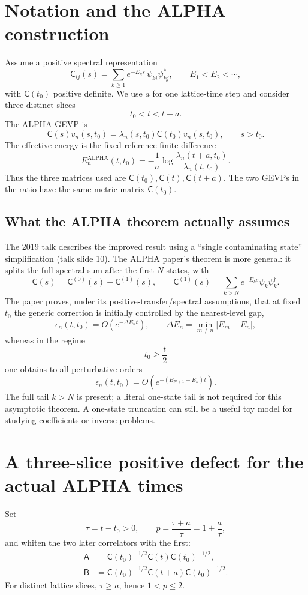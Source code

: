 \documentclass[11pt]{article}
\newcommand{\C}{\mathsf C}
\newcommand{\A}{\mathsf A}
\newcommand{\B}{\mathsf B}
\newcommand{\Ealp}{E^{\mathrm{ALPHA}}}
\begin{document}
\section{Notation and the ALPHA construction}
Assume a positive spectral representation
\[
\C_{ij}(s)=\sum_{k\geq1}e^{-E_k s}\,\psi_{ki}\psi_{kj}^*,\qquad
E_1<E_2<\cdots,
\]
with $\C(t_0)$ positive definite. We use $a$ for one lattice-time step and consider three distinct slices
\[
t_0<t<t+a.
\]
The ALPHA GEVP is
\[
\C(s)v_n(s,t_0)=\lambda_n(s,t_0)\C(t_0)v_n(s,t_0),
\qquad s>t_0.
\]
The effective energy is the fixed-reference finite difference
\begin{equation}
\Ealp_n(t,t_0)=-\frac1a\log\frac{\lambda_n(t+a,t_0)}{\lambda_n(t,t_0)}.
\label{eq:alpha}
\end{equation}
Thus the three matrices used are $\C(t_0),\C(t),\C(t+a)$. The two GEVPs in the ratio have the same metric matrix $\C(t_0)$.

\subsection*{What the ALPHA theorem actually assumes}
The 2019 talk describes the improved result using a ``single contaminating state'' simplification (talk slide 10). The ALPHA paper's theorem is more general: it splits the full spectral sum after the first $N$ states, with
\[
\C(s)=\C^{(0)}(s)+\C^{(1)}(s),\qquad
\C^{(1)}(s)=\sum_{k>N}e^{-E_k s}\psi_k\psi_k^\dagger.
\]
The paper proves, under its positive-transfer/spectral assumptions, that at fixed $t_0$ the generic correction is initially controlled by the nearest-level gap,
\[
\epsilon_n(t,t_0)=O(e^{-\Delta E_n t}),\qquad
\Delta E_n=\min_{m\ne n}|E_m-E_n|,
\]
whereas in the regime
\begin{equation}
 t_0\geq\frac t2
 \label{eq:alphacond}
\end{equation}
one obtains to all perturbative orders
\begin{equation}
\boxed{\epsilon_n(t,t_0)=O\!\left(e^{-(E_{N+1}-E_n)t}\right).}
\label{eq:alphagap}
\end{equation}
The full tail $k>N$ is present; a literal one-state tail is not required for this asymptotic theorem. A one-state truncation can still be a useful toy model for studying coefficients or inverse problems.

\section{A three-slice positive defect for the actual ALPHA times}
Set
\[
\tau=t-t_0>0,\qquad p=\frac{\tau+a}{\tau}=1+\frac a\tau,
\]
and whiten the two later correlators with the first:
\begin{align}
\A&=\C(t_0)^{-1/2}\C(t)\C(t_0)^{-1/2},\\
\B&=\C(t_0)^{-1/2}\C(t+a)\C(t_0)^{-1/2}.
\end{align}
For distinct lattice slices, $\tau\geq a$, hence $1<p\leq2$.
\end{document}

